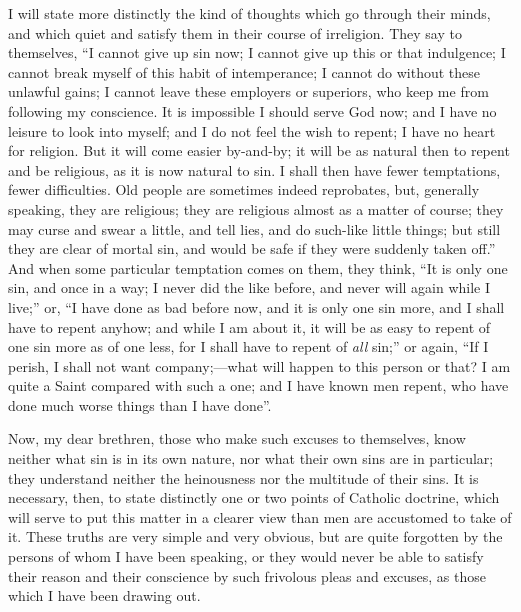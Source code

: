 I will state more distinctly the kind of thoughts which go through
their minds, and which quiet and satisfy them in their course of
irreligion. They say to themselves, ``I cannot give up sin now; I
cannot give up this or that indulgence; I cannot break myself of this
habit of intemperance; I cannot do without these unlawful gains; I
cannot leave these employers or superiors, who keep me from following
my conscience. It is impossible I should serve God now; and I have no
leisure to look into myself; and I do not feel the wish to repent; I
have no heart for religion. But it will come easier by-and-by; it will
be as natural then to repent and be religious, as it is now natural to
sin. I shall then have fewer temptations, fewer difficulties. Old
people are sometimes indeed reprobates, but, generally speaking, they
are religious; they are religious almost as a matter of course; they
may curse and swear a little, and tell lies, and do such-like little
things; but still they are clear of mortal sin, and would be safe if
they were suddenly taken off.'' And when some particular
temptation comes on them, they think, ``It is only one sin, and
once in a way; I never did the like before, and never will again while
I live;'' or, ``I have done as bad before now, and it is only
one sin more, and I shall have to repent anyhow; and while I am about
it, it will be as easy to repent of one sin more as of one less, for I
shall have to repent of \emph{all} sin;'' or again, ``If I
perish, I shall not want company;—what will happen to this person or
that? I am quite a Saint compared with such a one; and I have known
men repent, who have done much worse things than I have done''.

Now, my dear brethren, those who make such excuses to themselves,
know neither what sin is in its own nature, nor what their own sins
are in particular; they understand neither the heinousness nor the
multitude of their sins. It is necessary, then, to state distinctly
one or two points of Catholic doctrine, which will serve to put this
matter in a clearer view than men are accustomed to take of it. These
truths are very simple and very obvious, but are quite forgotten by
the persons of whom I have been speaking, or they would never be able
to satisfy their reason and their conscience by such frivolous pleas
and excuses, as those which I have been drawing out.

